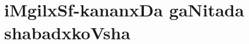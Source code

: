 \makeatletter
\def\@makechapterhead#1{%
  \vspace*{-25\p@}%
  {\parindent \z@ \raggedleft \normalfont
    \ifnum \c@secnumdepth >\m@ne
      \if@mainmatter
        \centering\Large\bfseries \vskip 2pt
        \par\nobreak
        \vskip 1\p@
      \fi
    \fi
    \interlinepenalty\@M
    \huge \bfseries #1\par\nobreak
\vskip 5pt

 \vskip 5\p@  
  }}
\makeatother

\chapter{iMgilxSf-kananxDa gaNitada shabadxkoVsha}

